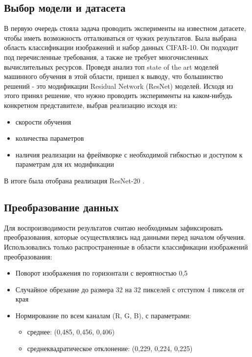 \documentclass[a4paper,article,14pt]{extarticle}
\begin{document}
\subsection{Выбор модели и датасета}
В первую очередь стояла задача проводить эксперименты на известном датасете, чтобы иметь возможность отталкиваться от чужих результатов. Была выбрана область классификации изображений и набор данных \flqq CIFAR-10\frqq. Он подходит под перечисленные требования, а также не требует многочисленных вычислительных ресурсов. Проведя анализ топ state of the art моделей машинного обучения в этой области, пришел к выводу, что большинство решений - это модификации Residual Network (ResNet) моделей. Исходя из этого принял решение, что нужно проводить эксперименты на каком-нибудь конкретном представителе, выбрав реализацию исходя из:
\begin{itemize}
    \item скорости обучения
    \item количества параметров
    \item наличия реализации на фреймворке с необходимой гибкостью и доступом к параметрам для их модификации
\end{itemize}

В итоге была отобрана реализация ResNet-20 \cite{github_resnet}.


\subsection{Преобразование данных}
Для воспроизводимости результатов считаю необходимым зафиксировать преобразования, которые осуществлялись над данными перед началом обучения.
Использовались только распространенные в области классификации изображений преобразования:
\begin{itemize}
\item Поворот изображения по горизонтали с вероятностью 0,5
\item Случайное обрезание до размера 32 на 32 пикселей с отступом 4 пикселя от края
\item Нормирование по всем каналам (R, G, B), с параметрами:
    \begin{itemize}
        \item  среднее: (0,485, 0,456, 0,406)
        \item среднеквадратическое отклонение: (0,229, 0,224, 0,225)
    \end{itemize}
\end{itemize}
\end{document}
